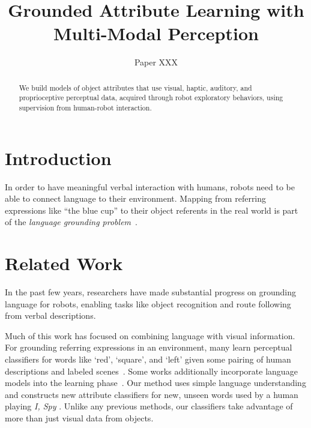 \documentclass{article}
\title{Grounded Attribute Learning with Multi-Modal Perception}
\author{Paper XXX}
\newcommand{\ispy}{\textit{I, Spy} }
\begin{document}
\maketitle

\begin{abstract}
	We build models of object attributes that use visual, haptic, auditory, and proprioceptive perceptual data, acquired through robot exploratory behaviors, using supervision from human-robot interaction.
\end{abstract}

\section{Introduction}

	In order to have meaningful verbal interaction with humans, robots need to be able to connect language to their environment. Mapping from referring expressions like ``the blue cup'' to their object referents in the real world is part of the \textit{language grounding problem}~\cite{that old roy paper i think}.

\section{Related Work}

	In the past few years, researchers have made substantial progress on grounding language for robots, enabling tasks like object recognition and route following from verbal descriptions.

	Much of this work has focused on combining language with visual information. For grounding referring expressions in an environment, many learn perceptual classifiers for words like `red', `square', and `left' given some pairing of human descriptions and labeled scenes~\cite{liu:acl14,malinowski:nips14,mohan:acs13,sun:icra13,dindo:iros10}. Some works additionally incorporate language models into the learning phase~\cite{spranger:ijcai15,krishnamurthy:acl13,perera:aaai13,matuszek:icml12}. Our method uses simple language understanding and constructs new attribute classifiers for new, unseen words used by a human playing \ispy. Unlike any previous methods, our classifiers take advantage of more than just visual data from objects.
\end{document}
